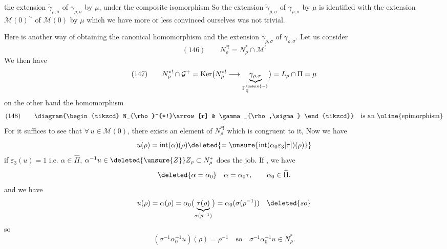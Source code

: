 
the extension $\widetilde\gamma_{\rho,\sigma}$ of $\gamma_{\rho,\sigma}$ by $\mu$,
under the composite isomorphism
So the extension $\widetilde\gamma_{\rho,\sigma}$ of $\gamma_{\rho,\sigma}$ by
$\mu$ is identified  with the extension $\mathcal M(0)^{\sim}$ of
$\mathcal M(0)$ by $\mu$ which we have more or less convinced ourselves
was not trivial.

Here is another way of obtaining the canonical homomorphism
and the extension $\widetilde\gamma_{\rho,\sigma}$ of $\gamma_{\rho,\sigma}$.
Let us consider
\[
 (146)\qquad N_{\rho}^{*!}=N^*_{\rho}\cap\mathcal M^!
\]
We then have
\[
 (147)\qquad
 N_{\rho}^{*!}\cap\mathcal G^+
 =\operatorname{Ker}\bigl(N_{\rho}^{*!}\longrightarrow
     \underbrace{\gamma_{\rho,\sigma}}_{\Gamma_{\mathbb Q}^{\unsure{\sim}}}\bigr)
 =L_{\rho}\cap\Pi=\mu
\]
on the other hand the homomorphism
\[
 (148)\qquad
 \diagram{\begin{tikzcd}
 N_{\rho}^{*!}\arrow[r] & \gamma_{\rho,\sigma}
 \end{tikzcd}}
 \quad\text{is an \uline{epimorphism}}
\]
For  it suffices to see that 
$\forall\,u\in\mathcal M(0)$, there exists an element of $N_{\rho}^{*!}$
which is congruent to it,  Now we have
\[
 u(\rho)=\operatorname{int}(\alpha)(\rho)
 \deleted{=\unsure{\operatorname{int}(\alpha_0\varepsilon_3[\tau])(\rho)}}
\]
if $\varepsilon_3(u)=1$ i.e. $\alpha\in\widehat\Pi$,
$\alpha^{-1}u\in\deleted{\unsure{Z}}Z_{\rho}\subset N^*_{\rho}$
does the job. If 
, we have
\[
 \deleted{\alpha=\alpha_0}\quad\alpha=\alpha_0\tau,\qquad\alpha_0\in\widehat\Pi.
\]
and we have
\[
 u(\rho)=\alpha(\rho)=
 \alpha_0\bigl(\underbrace{\tau(\rho)}_{\sigma(\rho^{-1})}\bigr)
 =\alpha_0(\sigma(\rho^{-1}))\quad\deleted{so}
\]
so
\[
 (\sigma^{-1}\alpha_0^{-1}u)(\rho)=\rho^{-1}
 \quad\text{so}\quad\sigma^{-1}\alpha_0^{-1}u\in N^*_{\rho}.
\]


